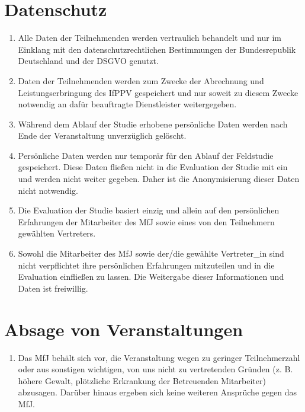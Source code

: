 \documentclass[a4paper, 12pt]{scrartcl}
\begin{document}
    \section{Datenschutz}
    \begin{enumerate}
        \item Alle Daten der Teilnehmenden werden vertraulich behandelt und nur im Einklang mit den datenschutzrechtlichen Bestimmungen der Bundesrepublik Deutschland und der DSGVO genutzt.

        \item Daten der Teilnehmenden werden zum Zwecke der Abrechnung und Leistungserbringung des IfPPV gespeichert und nur soweit zu diesem Zwecke notwendig an daf\"ur beauftragte Dienstleister weitergegeben.
        
        \item W\"ahrend dem Ablauf der Studie erhobene pers\"onliche Daten werden nach Ende der Veranstaltung unverz\"uglich gel\"oscht.
        
        \item Pers\"onliche Daten werden nur tempor\"ar f\"ur den Ablauf der Feldstudie gespeichert. Diese Daten flie{\ss}en nicht in die Evaluation der Studie mit ein und werden nicht weiter gegeben. Daher ist die Anonymisierung dieser Daten nicht notwendig.
        
        \item Die Evaluation der Studie basiert einzig und allein auf den pers\"onlichen Erfahrungen der Mitarbeiter des MfJ sowie eines von den Teilnehmern gew\"ahlten Vertreters.
        
        \item Sowohl die Mitarbeiter des MfJ sowie der/die gew\"ahlte Vertreter\_in sind nicht verpflichtet ihre pers\"onlichen Erfahrungen mitzuteilen und in die Evaluation einflie{\ss}en zu lassen. Die Weitergabe dieser Informationen und Daten ist freiwillig.
    \end{enumerate}
    
    \section{Absage von Veranstaltungen}
    \begin{enumerate}
        \item Das MfJ beh\"alt sich vor, die Veranstaltung wegen zu geringer Teilnehmerzahl oder aus sonstigen wichtigen, von uns nicht zu vertretenden Gr\"unden (z. B. h\"ohere Gewalt, pl\"otzliche Erkrankung der Betreuenden Mitarbeiter) abzusagen.
        Dar\"uber hinaus ergeben sich keine weiteren Anspr\"uche gegen das MfJ.
    \end{enumerate}
\end{document}
